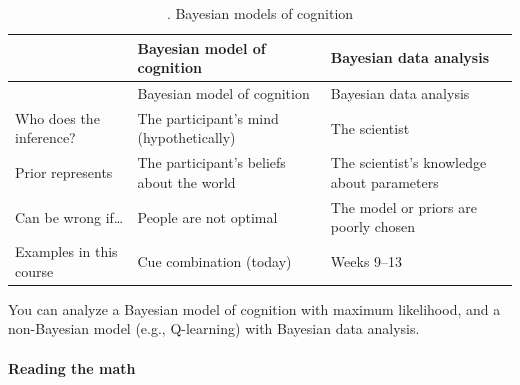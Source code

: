 \begin{longtable}[]{@{}
  >{\raggedright\arraybackslash}p{}
  >{\raggedright\arraybackslash}p{}
  >{\raggedright\arraybackslash}p{}@{}}
\caption{. Bayesian models of cognition}\tabularnewline
\toprule\noalign{}
\begin{minipage}[b]{\linewidth}\raggedright
\end{minipage} & \begin{minipage}[b]{\linewidth}\raggedright
Bayesian model of cognition
\end{minipage} & \begin{minipage}[b]{\linewidth}\raggedright
Bayesian data analysis
\end{minipage} \\
\midrule\noalign{}
\endfirsthead
\toprule\noalign{}
\begin{minipage}[b]{\linewidth}\raggedright
\end{minipage} & \begin{minipage}[b]{\linewidth}\raggedright
Bayesian model of cognition
\end{minipage} & \begin{minipage}[b]{\linewidth}\raggedright
Bayesian data analysis
\end{minipage} \\
\midrule\noalign{}
\endhead
\bottomrule\noalign{}
\endlastfoot
Who does the inference? & The participant's mind (hypothetically) & The
scientist \\
Prior represents & The participant's beliefs about the world & The
scientist's knowledge about parameters \\
Can be wrong if\ldots{} & People are not optimal & The model or priors
are poorly chosen \\
Examples in this course & Cue combination (today) & Weeks 9--13 \\
\end{longtable}

You can analyze a Bayesian model of cognition with maximum likelihood,
and a non-Bayesian model (e.g., Q-learning) with Bayesian data analysis.

\paragraph{Reading the math}

